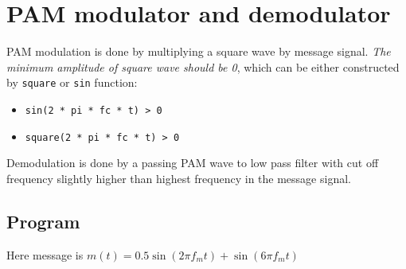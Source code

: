 \chapter{PAM modulator and demodulator}

PAM modulation is done by multiplying a square wave by message signal.
\textit{The minimum amplitude of square wave should be 0}, which can be either constructed by \texttt{square} or \texttt{sin} function:
\begin{itemize}
	\item \texttt{sin(2 * pi * fc * t) > 0}
	\item \texttt{square(2 * pi * fc * t) > 0}
\end{itemize}








Demodulation is done by a passing PAM wave to low pass filter with cut off frequency slightly higher than highest frequency in the message signal.
\section*{Program}
Here message is $m(t) = 0.5\sin(2\pi f_m t) + \sin(6\pi f_m t)$


